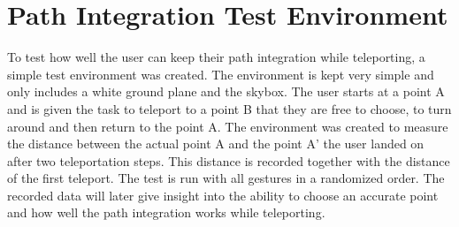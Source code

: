 \section{Path Integration Test Environment} %
To test how well the user can keep their path integration while teleporting, a simple test environment was created. The environment is kept very simple and only includes a white ground plane and the skybox. The user starts at a point A and is given the task to teleport to a point B that they are free to choose, to turn around and then return to the point A. The environment was created to measure the distance between the actual point A and the point A' the user landed on after two teleportation steps. This distance is recorded together with the distance of the first teleport. The test is run with all gestures in a randomized order. The recorded data will later give insight into the ability to choose an accurate point and how well the path integration works while teleporting.
